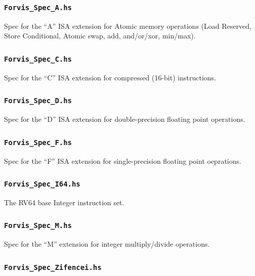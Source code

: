 \documentclass[11pt]{article}
\begin{document}

\subsubsection{\tt Forvis\_Spec\_A.hs}

Spec for the ``A'' ISA extension for Atomic memory
operations (Load Reserved, Store Conditional, Atomic swap, add,
and/or/xor, min/max).


\subsubsection{\tt Forvis\_Spec\_C.hs}

Spec for the ``C'' ISA extension for compressed (16-bit) instructions.


\subsubsection{\tt Forvis\_Spec\_D.hs}

Spec for the ``D'' ISA extension for double-precision floating point operations.


\subsubsection{\tt Forvis\_Spec\_F.hs}

Spec for the ``F'' ISA extension for single-precision floating point oeprations.


\subsubsection{\tt Forvis\_Spec\_I64.hs}

The RV64 base Integer instruction set.


\subsubsection{\tt Forvis\_Spec\_M.hs}

Spec for the ``M'' extension for integer multiply/divide operations.


\subsubsection{\tt Forvis\_Spec\_Zifencei.hs}
\end{document}
